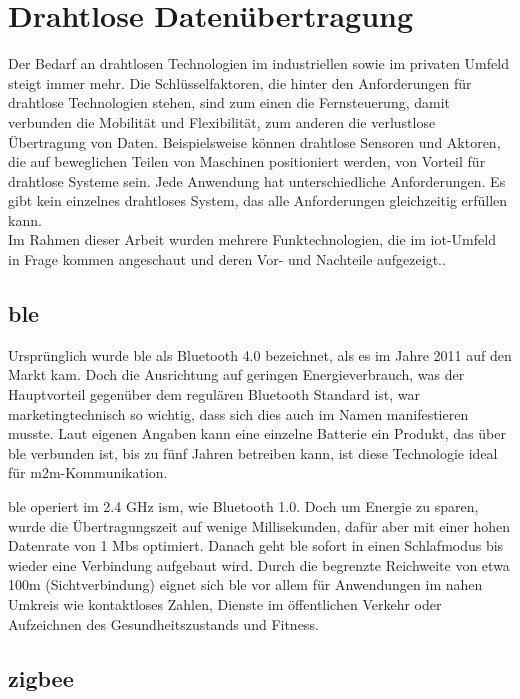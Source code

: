 \chapter{Drahtlose Datenübertragung}

Der Bedarf an drahtlosen Technologien im industriellen sowie im privaten Umfeld steigt immer mehr. Die Schlüsselfaktoren, die hinter den Anforderungen für drahtlose Technologien stehen, sind zum einen die Fernsteuerung, damit verbunden die Mobilität und Flexibilität, zum anderen die verlustlose Übertragung von Daten. Beispielsweise können drahtlose Sensoren und Aktoren, die auf beweglichen Teilen von Maschinen positioniert werden, von Vorteil für drahtlose Systeme sein. Jede Anwendung hat unterschiedliche Anforderungen. Es gibt kein einzelnes drahtloses System, das alle Anforderungen gleichzeitig erfüllen kann.\\
Im Rahmen dieser Arbeit wurden mehrere Funktechnologien, die im \acrshort{iot}-Umfeld in Frage kommen angeschaut und deren Vor- und Nachteile aufgezeigt..

\section{\acrshort{ble}}

Ursprünglich wurde \acrfull{ble} als \glqq{}Bluetooth 4.0\grqq{} bezeichnet, als es im Jahre 2011 auf den Markt kam. Doch die Ausrichtung auf geringen Energieverbrauch, was der Hauptvorteil gegenüber dem regulären Bluetooth Standard ist, war marketingtechnisch so wichtig, dass sich dies auch im Namen manifestieren musste. Laut eigenen Angaben kann eine einzelne Batterie ein Produkt, das über \acrshort{ble} verbunden ist, bis zu fünf Jahren betreiben kann, ist diese Technologie ideal für \acrshort{m2m}-Kommunikation.

\acrshort{ble} operiert im 2.4 GHz \gls{ism}, wie Bluetooth 1.0. Doch um Energie zu sparen, wurde die Übertragungszeit auf wenige Millisekunden, dafür aber mit einer hohen Datenrate von 1 Mbs optimiert. Danach geht \acrshort{ble} sofort in einen Schlafmodus bis wieder eine Verbindung aufgebaut wird.
Durch die begrenzte Reichweite von etwa 100m (Sichtverbindung) eignet sich \acrshort{ble} vor allem für Anwendungen im nahen Umkreis wie kontaktloses Zahlen, Dienste im öffentlichen Verkehr oder Aufzeichnen des Gesundheitszustands und Fitness.

\section{\gls{zigbee}}

